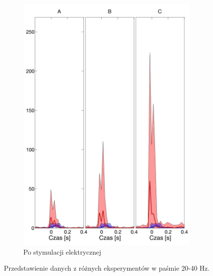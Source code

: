 \documentclass{pracamgr}
\begin{document}
\begin{figure}[h]
\begin{subfigure}{.5\textwidth}
			\includegraphics[width=1.\linewidth]{beta3_20-40_z_CxC5_do_SC42.png}
			\caption{Po stymulacji elektrycznej}
			\label{rys:20_40_beta_CxC_SC}
		\end{subfigure}
		\caption{Przedstawienie danych z różnych eksperymentów w paśmie 20-40 Hz.}
		\label{rys:20_40_CxC_SC}
	\end{figure}
	\FloatBarrier
\end{document}

